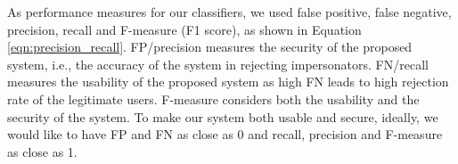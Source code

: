 As performance measures for our classifiers, we used false positive, false negative, precision, recall and
F-measure (F1 score), as shown in  Equation \ref{eqn:precision_recall}.
FP/precision measures the security of the proposed system, i.e., the accuracy of
the system in rejecting impersonators. FN/recall measures the usability of the
proposed system as high FN leads to high rejection rate of the legitimate
users.  F-measure considers both the usability and the security of the system.
To make our system both usable and secure, ideally, we would like to have FP and FN
as close as 0 and recall, precision and F-measure as close as 1. 

\vspace{-1mm}
{\scriptsize{


\vspace{-3mm}
}}




